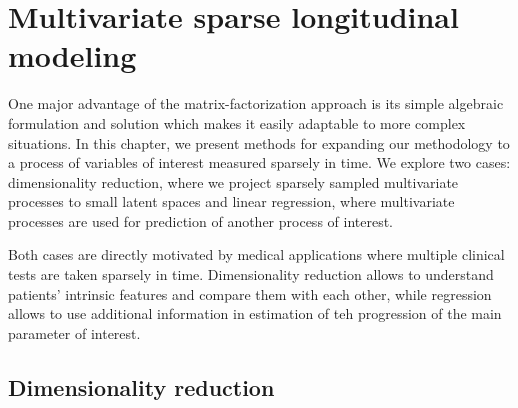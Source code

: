 \documentclass[preprint]{imsart}
\numberwithin{equation}{section}
\theoremstyle{plain}
\newcommand{\bX}{\mathbf{X}}
\begin{document}





\section{Multivariate sparse longitudinal modeling}

One major advantage of the matrix-factorization approach is its simple algebraic formulation and solution which makes it easily adaptable to more complex situations. In this chapter, we present methods for expanding our methodology to a process of variables of interest measured sparsely in time. We explore two cases: dimensionality reduction, where we project sparsely sampled multivariate processes to small latent spaces and linear regression, where multivariate processes are used for prediction of another process of interest.

Both cases are directly motivated by medical applications where multiple clinical tests are taken sparsely in time. Dimensionality reduction allows to understand patients' intrinsic features and compare them with each other, while regression allows to use additional information in estimation of teh progression of the main parameter of interest.

\subsection{Dimensionality reduction}
\end{document}
